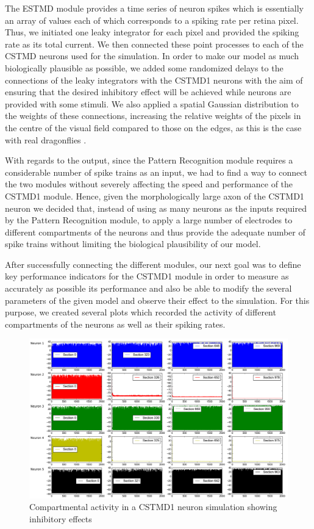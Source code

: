 \documentclass[a4paper,11pt]{article}
\begin{document}
The ESTMD module provides a time series of neuron spikes which is essentially an array of values each of which corresponds to a spiking rate per retina pixel. Thus, we initiated one leaky integrator for each pixel and provided the spiking rate as its total current. We then connected these point processes to each of the CSTMD neurons used for the simulation. In order to make our model as much biologically plausible as possible, we added some randomized delays to the connections of the leaky integrators with the CSTMD1 neurons with the aim of ensuring that the desired inhibitory effect will be achieved while neurons are provided with some stimuli. We also applied a spatial Gaussian distribution to the weights of these connections, increasing the relative weights of the pixels in the centre of the visual field compared to those on the edges, as this is the case with real dragonflies \cite{w13}.

With regards to the output, since the Pattern Recognition module requires a considerable number of spike trains as an input, we had to find a way to connect the two modules without severely affecting the speed and performance of the CSTMD1 module. Hence, given the morphologically large axon of the CSTMD1 neuron \cite{geurten} we decided that, instead of using as many neurons as the inputs required by the Pattern Recognition module, to apply a large number of electrodes to different compartments of the neurons and thus provide the adequate number of spike trains without limiting the biological plausibility of our model.

After successfully connecting the different modules, our next goal was to define key performance indicators for the CSTMD1 module in order to measure as accurately as possible its performance and also be able to modify the several parameters of the given model and observe their effect to the simulation. For this purpose, we created several plots which recorded the activity of different compartments of the neurons as well as their spiking rates. 


\begin{figure}[h]
\centering
\includegraphics[scale = 0.3]{compartments}
\caption{Compartmental activity in a CSTMD1 neuron simulation showing inhibitory effects}
\end{figure}
\end{document}
